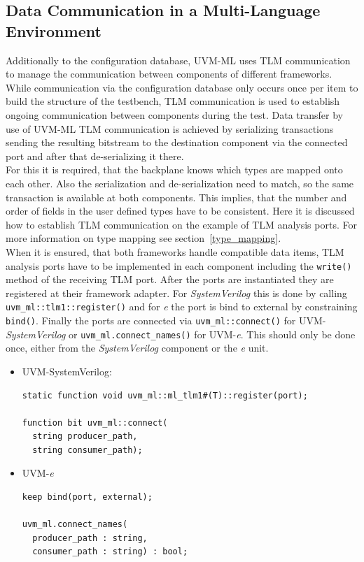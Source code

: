 \subsection{Data Communication in a Multi-Language Environment} \label{ml_tlm}
Additionally to the configuration database, UVM-ML uses TLM communication to manage the communication between components
of different frameworks. While communication via the configuration database only occurs once per item to build the
structure of the testbench, TLM communication is used to establish ongoing communication between components during the
test. Data transfer by use of UVM-ML TLM communication is achieved by serializing transactions sending the resulting
bitstream to the destination component via the connected port and after that de-serializing it there.\\
For this it is required, that the backplane knows which types are mapped onto each other. Also the serialization and
de-serialization need to match, so the same transaction is available at both components. This implies, that the number
and order of fields in the user defined types have to be consistent.
Here it is discussed how to establish TLM communication on the example of TLM analysis ports. For more information on
type mapping see section~\ref{type_mapping}.\\
When it is ensured, that both frameworks handle compatible data items, TLM analysis ports have to be implemented in each
component including the \lstinline$write()$ method of the receiving TLM port. After the ports are instantiated they
are registered at their framework adapter. For \emph{SystemVerilog} this is done by calling
\lstinline$uvm_ml::tlm1::register()$ and for \textit{e} the port is bind to external by constraining \lstinline$bind()$.
Finally the ports are connected via \lstinline$uvm_ml::connect()$ for UVM-\emph{SystemVerilog} or
\lstinline$uvm_ml.connect_names()$ for UVM-\textit{e}. This should only be done once, either from the
\emph{SystemVerilog} component or the \textit{e} unit.
\begin{itemize}
\item{UVM-SystemVerilog:}
{}
\begin{lstlisting}
static function void uvm_ml::ml_tlm1#(T)::register(port);

function bit uvm_ml::connect(
  string producer_path,
  string consumer_path);
\end{lstlisting} 

\item{UVM-\textit{e}}
{}
\begin{lstlisting}
keep bind(port, external);

uvm_ml.connect_names(
  producer_path : string,
  consumer_path : string) : bool;
\end{lstlisting} 
\end{itemize}

